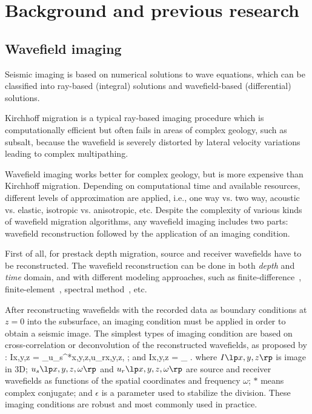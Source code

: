 \section{Background and previous research}

\subsection{Wavefield imaging}
Seismic imaging is based on numerical solutions to wave equations, which can be classified into ray-based (integral) solutions and wavefield-based (differential) solutions. 

Kirchhoff migration is a typical ray-based imaging procedure which is computationally efficient but often fails in areas of complex geology, such as subsalt, because the wavefield is severely distorted by lateral velocity variations leading to complex multipathing.

Wavefield imaging works better for complex geology, but is more expensive than Kirchhoff migration. Depending on computational time and available resources, different levels of approximation are applied, i.e., one way vs. two way, acoustic vs. elastic, isotropic vs. anisotropic, etc. Despite the complexity of various kinds of wavefield migration algorithms, any wavefield imaging includes two parts: wavefield reconstruction followed by the application of an imaging condition. 

First of all, for prestack depth migration, source and receiver wavefields have to be reconstructed.
The wavefield reconstruction can be done in both \emph{depth} and \emph{time} domain, and with different modeling approaches, such as finite-difference~\cite[]{GEO51-01-00540066,SWP00-00-03100318}, finite-element~\cite[]{GEO41-01-01450151}, spectral method~\cite[]{SEG-1991-1561,SEG-1992-1285,SEG-1996-0427}, etc.

After reconstructing wavefields with the recorded data as boundary conditions at $z=0$ into the subsurface, an imaging condition must be applied in order to obtain a seismic image. The simplest types of imaging condition are based on cross-correlation or deconvolution of the reconstructed wavefields, as proposed by \cite{GEO36-03-04670481}:
\beq
\label{eqn:CIC1}
I\lp x,y,z \rp = \sum_\omega u_s^*\lp x,y,z,\omega \rp u_r\lp x,y,z,\omega \rp  \; ;
\eeq
and
\beq
\label{eqn:CIC2}        
I\lp x,y,z \rp = \sum_\omega {} \; .
\eeq
where $I\lp x,y,z \rp$ is image in 3D; $u_s\lp x,y,z,\omega \rp$ and $u_r\lp x,y,z,\omega \rp$ are source and receiver wavefields as functions of the spatial coordinates and frequency $\omega$; $\ast$ means complex conjugate; and $\epsilon$ is a parameter used to stabilize the division. These imaging conditions are robust and most commonly used in practice.

